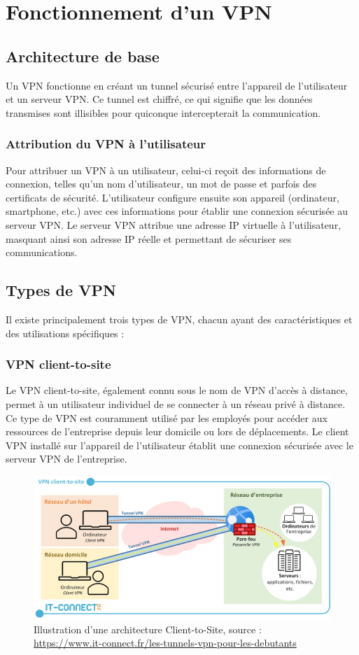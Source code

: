 \documentclass{report}
\begin{document}
\chapter{Fonctionnement d'un VPN}
\section{Architecture de base}
Un VPN fonctionne en créant un tunnel sécurisé entre l'appareil de l'utilisateur et un serveur VPN. Ce tunnel est chiffré, ce qui signifie que les données transmises sont illisibles pour quiconque intercepterait la communication.

\subsection{Attribution du VPN à l'utilisateur}
Pour attribuer un VPN à un utilisateur, celui-ci reçoit des informations de connexion, telles qu'un nom d'utilisateur, un mot de passe et parfois des certificats de sécurité. L'utilisateur configure ensuite son appareil (ordinateur, smartphone, etc.) avec ces informations pour établir une connexion sécurisée au serveur VPN. Le serveur VPN attribue une adresse IP virtuelle à l'utilisateur, masquant ainsi son adresse IP réelle et permettant de sécuriser ses communications.

\section{Types de VPN}
Il existe principalement trois types de VPN, chacun ayant des caractéristiques et des utilisations spécifiques \cite{2} :

\subsection{VPN client-to-site}
Le VPN client-to-site, également connu sous le nom de VPN d'accès à distance, permet à un utilisateur individuel de se connecter à un réseau privé à distance. Ce type de VPN est couramment utilisé par les employés pour accéder aux ressources de l'entreprise depuis leur domicile ou lors de déplacements. Le client VPN installé sur l'appareil de l'utilisateur établit une connexion sécurisée avec le serveur VPN de l'entreprise.

\begin{figure}[H]
  \centering
  \includegraphics[width=1\textwidth]{img/clientToSite.png}
  \caption{Illustration d'une architecture Client-to-Site, source : \url{https://www.it-connect.fr/les-tunnels-vpn-pour-les-debutants}}
\end{figure}
\end{document}
